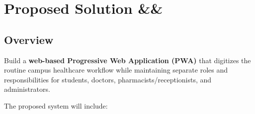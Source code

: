 \documentclass[11pt,a4paper]{article}
\newcommand{\BvrHint}[1]{%
  \ifx&#1&%
  \else
    {\normalfont\normalsize\itshape\hfill #1}%
  \fi}
\begin{document}

\section{Proposed Solution %
\BvrHint{}}

\subsection{Overview}

Build a \textbf{web-based Progressive Web Application (PWA)} that digitizes the routine campus healthcare workflow while maintaining separate roles and responsibilities for students, doctors, pharmacists/receptionists, and administrators.

The proposed system will include:
\end{document}
